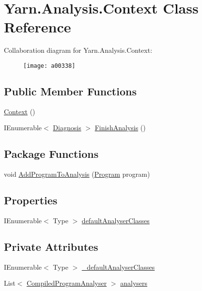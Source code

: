 \hypertarget{a00045}{\section{Yarn.\-Analysis.\-Context Class Reference}
\label{a00045}
}


Collaboration diagram for Yarn.\-Analysis.\-Context\-:
\nopagebreak
\begin{figure}[H]
\begin{center}
\leavevmode
\texttt{[image: a00338]}
\end{center}
\end{figure}
\subsection*{Public Member Functions}
\begin{DoxyCompactItemize}
\item 
\hyperlink{a00045_a8e2c56843e8d374b0f90e23326d8d14a}{Context} ()
\item 
I\-Enumerable$<$ \hyperlink{a00049}{Diagnosis} $>$ \hyperlink{a00045_a1eadea062a5899a64d00ea0172cbbb43}{Finish\-Analysis} ()
\end{DoxyCompactItemize}
\subsection*{Package Functions}
\begin{DoxyCompactItemize}
\item 
void \hyperlink{a00045_a60255a6d54f296d199507acef251244c}{Add\-Program\-To\-Analysis} (\hyperlink{a00081}{Program} program)
\end{DoxyCompactItemize}
\subsection*{Properties}
\begin{DoxyCompactItemize}
\item 
I\-Enumerable$<$ Type $>$ \hyperlink{a00045_afdf24f2512251c2203ba1bde8f4a0f90}{default\-Analyser\-Classes}
\end{DoxyCompactItemize}
\subsection*{Private Attributes}
\begin{DoxyCompactItemize}
\item 
I\-Enumerable$<$ Type $>$ \hyperlink{a00045_ad06829cf848a5936db5724ebced758ec}{\-\_\-default\-Analyser\-Classes}
\item 
List$<$ \hyperlink{a00042}{Compiled\-Program\-Analyser} $>$ \hyperlink{a00045_aa5c7eaa90ad9c47969a3b336080d8991}{analysers}
\end{DoxyCompactItemize}


